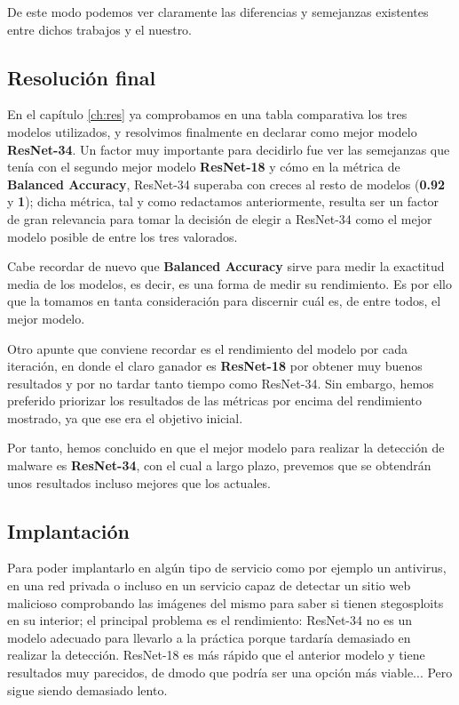De este modo podemos ver claramente las diferencias y semejanzas existentes entre dichos trabajos y el nuestro.

\subsection{Resolución final}

En el capítulo \ref{ch:res} ya comprobamos en una tabla comparativa los tres modelos utilizados, y resolvimos finalmente en declarar como mejor modelo \textbf{ResNet-34}. Un factor muy importante para decidirlo fue ver las semejanzas que tenía con el segundo mejor modelo \textbf{ResNet-18} y cómo en la métrica de \textbf{Balanced Accuracy}, ResNet-34 superaba con creces al resto de modelos (\textbf{0.92} y \textbf{1}); dicha métrica, tal y como redactamos anteriormente, resulta ser un factor de gran relevancia para tomar la decisión de elegir a ResNet-34 como el mejor modelo posible de entre los tres valorados.

Cabe recordar de nuevo que \textbf{Balanced Accuracy} sirve para medir la exactitud media de los modelos, es decir, es una forma de medir su rendimiento. Es por ello que la tomamos en tanta consideración para discernir cuál es, de entre todos, el mejor modelo.

Otro apunte que conviene recordar es el rendimiento del modelo por cada iteración, en donde el claro ganador es \textbf{ResNet-18} por obtener muy buenos resultados y por no tardar tanto tiempo como ResNet-34. Sin embargo, hemos preferido priorizar los resultados de las métricas por encima del rendimiento mostrado, ya que ese era el objetivo inicial. 

Por tanto, hemos concluido en que el mejor modelo para realizar la detección de malware es  \textbf{ResNet-34}, con el cual a largo plazo, prevemos que se obtendrán unos resultados incluso mejores que los actuales.

\subsection{Implantación}

Para poder implantarlo en algún tipo de servicio como por ejemplo un antivirus, en una red privada o incluso en un servicio capaz de detectar un sitio web malicioso comprobando las imágenes del mismo para saber si tienen stegosploits en su interior; el principal problema es el rendimiento: ResNet-34 no es un modelo adecuado para llevarlo a la práctica porque tardaría demasiado en realizar la detección. ResNet-18 es más rápido que el anterior modelo y tiene resultados muy parecidos, de dmodo que podría ser una opción más viable... Pero sigue siendo demasiado lento.

